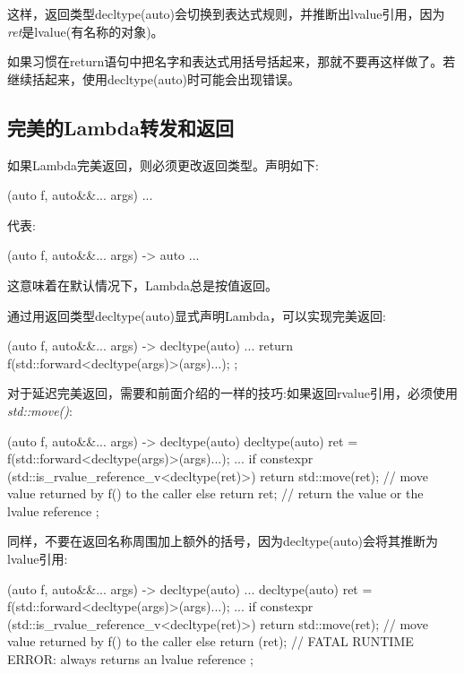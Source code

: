 这样，返回类型decltype(auto)会切换到表达式规则，并推断出lvalue引用，因为\textit{ret}是lvalue(有名称的对象)。

如果习惯在return语句中把名字和表达式用括号括起来，那就不要再这样做了。若继续括起来，使用decltype(auto)时可能会出现错误。

\subsection{完美的Lambda转发和返回}

如果Lambda完美返回，则必须更改返回类型。声明如下:

\begin{cppcode}
[] (auto f, auto&&... args) {
	...
}
\end{cppcode}

代表:

\begin{cppcode}
[] (auto f, auto&&... args) -> auto {
	...
}
\end{cppcode}

这意味着在默认情况下，Lambda总是按值返回。

通过用返回类型decltype(auto)显式声明Lambda，可以实现完美返回:

\begin{cppcode}
[] (auto f, auto&&... args) -> decltype(auto) {
	...
	return f(std::forward<decltype(args)>(args)...);
};
\end{cppcode}

对于延迟完美返回，需要和前面介绍的一样的技巧:如果返回rvalue引用，必须使用\textit{std::move()}:

\begin{cppcode}
[] (auto f, auto&&... args) -> decltype(auto) {
	decltype(auto) ret = f(std::forward<decltype(args)>(args)...);
	...
	if constexpr (std::is_rvalue_reference_v<decltype(ret)>) {
		return std::move(ret); // move value returned by f() to the caller
	}
	else {
		return ret; // return the value or the lvalue reference
	}
};
\end{cppcode}

同样，不要在返回名称周围加上额外的括号，因为decltype(auto)会将其推断为lvalue引用:

\begin{cppcode}
[] (auto f, auto&&... args) -> decltype(auto) {
	...
	decltype(auto) ret = f(std::forward<decltype(args)>(args)...);
	...
	if constexpr (std::is_rvalue_reference_v<decltype(ret)>) {
		return std::move(ret); // move value returned by f() to the caller
	}
	else {
		return (ret); // FATAL RUNTIME ERROR: always returns an lvalue reference
	}
};
\end{cppcode}










